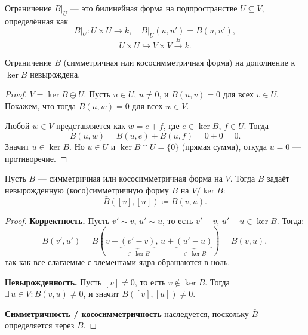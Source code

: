 


\begin{definition}    
    Ограничение $B|_U$ --- это билинейная форма на подпространстве $U \subseteq V$, определённая как
    \[
        B|_U \colon U \times U \to k, \quad B|_U(u, u') = B(u, u'),
    \]
    \[
        U \times U \hookrightarrow V \times V \xrightarrow{B} k.
    \]
\end{definition}


\begin{stmt}
    Ограничение $B$ (симметричная или кососимметричная форма) на дополнение к $\ker B$ невырождена.

    \begin{proof}
        $V = \ker B \oplus U$.
        Пусть $u \in U$, $u \neq 0$, и $B(u, v) = 0$ для всех $v \in U$. Покажем, что тогда $B(u, w) = 0$ для всех $w \in V$.

        Любой $w \in V$ представляется как $w = e + f$, где $e \in \ker B$, $f \in U$. Тогда
        \[
            B(u, w) = B(u, e) + B(u, f) = 0 + 0 = 0.
        \]
        Значит $u \in \ker B$. Но $u \in U$ и $\ker B \cap U = \{0\}$ (прямая сумма), откуда $u = 0$ --- противоречие.
    \end{proof}
\end{stmt}


\begin{stmt}
    Пусть $B$ --- симметричная или кососимметричная форма на $V$. 
    Тогда $B$ задаёт невырожденную (косо)симметричную форму $\bar{B}$ на $V / \ker B$:
    \[
        \bar{B}([v], [u]) \coloneqq B(v, u).
    \]

    \begin{proof}
        \textbf{Корректность.} Пусть $v' \sim v$, $u' \sim u$, то есть $v' - v, \, u' - u \in \ker B$. Тогда:
        \[
            B(v', u') = B(v + \underbrace{(v' - v)}_{\in\, \ker B},\, u + \underbrace{(u' - u)}_{\in\, \ker B}) = B(v, u),
        \]
        так как все слагаемые с элементами ядра обращаются в ноль.

        \textbf{Невырожденность.} Пусть $[v] \neq 0$, то есть $v \notin \ker B$.
        Тогда $\exists\, u \in V\colon B(v, u) \neq 0$, и значит $\bar{B}([v], [u]) \neq 0$.

        \textbf{Симметричность / кососимметричность} наследуется, поскольку $\bar{B}$ определяется через $B$.
    \end{proof}
\end{stmt}


